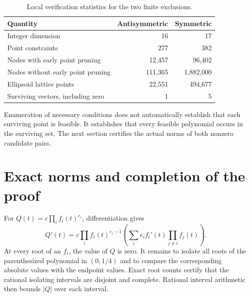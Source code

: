 \documentclass[11pt,a4paper]{article}
\begin{document}
\begin{table}[htbp]
\centering
\caption{Local verification statistics for the two finite exclusions.}
\begin{tabular}{lrr}
\toprule
Quantity & Antisymmetric & Symmetric\\
\midrule
Integer dimension &16&17\\
Point constraints &277&382\\
Nodes with early point pruning &12,457&96,402\\
Nodes without early point pruning &111,365&1,882,000\\
Ellipsoid lattice points &22,551&494,677\\
Surviving vectors, including zero &1&5\\
\bottomrule
\end{tabular}
\end{table}

Enumeration of necessary conditions does not automatically establish that each surviving point is feasible. It establishes that every feasible polynomial occurs in the surviving set. The next section certifies the actual norms of both nonzero candidate pairs.

\section{Exact norms and completion of the proof}\label{sec:norm}
For $Q(t)=c\prod_i f_i(t)^{e_i}$, differentiation gives
\[
Q'(t)=c\prod_i f_i(t)^{e_i-1}
\left(\sum_i e_i f_i'(t)\prod_{j\ne i}f_j(t)\right).
\]
At every root of an $f_i$, the value of $Q$ is zero. It remains to isolate all roots of the parenthesized polynomial in $(0,1/4)$ and to compare the corresponding absolute values with the endpoint values. Exact root counts certify that the rational isolating intervals are disjoint and complete. Rational interval arithmetic then bounds $|Q|$ over each interval.
\end{document}
